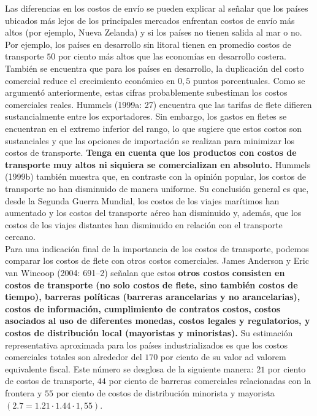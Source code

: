 Las diferencias en los costos de envío se pueden explicar al señalar que los países ubicados más lejos de los principales mercados enfrentan costos de envío más altos (por ejemplo, Nueva Zelanda) y si los países no tienen salida al mar o no. Por ejemplo, los países en desarrollo sin litoral tienen en promedio costos de transporte $50$ por ciento más altos que las economías en desarrollo costera. También se encuentra que para los países en desarrollo, la duplicación del costo comercial reduce el crecimiento económico en $0,5$ puntos porcentuales. Como se argumentó anteriormente, estas cifras probablemente subestiman los costos comerciales reales. Hummels (1999a: 27) encuentra que las tarifas de flete difieren sustancialmente entre los exportadores. Sin embargo, los gastos en fletes se encuentran en el extremo inferior del rango, lo que sugiere que estos costos son sustanciales y que las opciones de importación se realizan para minimizar los costos de transporte. \textbf{Tenga en cuenta que los productos con costos de transporte muy altos ni siquiera se comercializan en absoluto.} Hummels (1999b) también muestra que, en contraste con la opinión popular, los costos de transporte no han disminuido de manera uniforme. Su conclusión general es que, desde la Segunda Guerra Mundial, los costos de los viajes marítimos han aumentado y los costos del transporte aéreo han disminuido y, además, que los costos de los viajes distantes han disminuido en relación con el transporte cercano.\\
Para una indicación final de la importancia de los costos de transporte, podemos comparar los costos de flete con otros costos comerciales. James Anderson y Eric van Wincoop (2004: 691–2) señalan que estos \textbf{otros costos consisten en costos de transporte (no solo costos de flete, sino también costos de tiempo), barreras políticas (barreras arancelarias y no arancelarias), costos de información, cumplimiento de contratos costos, costos asociados al uso de diferentes monedas, costos legales y regulatorios, y costos de distribución local (mayoristas y minoristas).} Su estimación representativa aproximada para los países industrializados es que los costos comerciales totales son alrededor del $170$ por ciento de su valor ad valorem equivalente fiscal. Este número se desglosa de la siguiente manera: $21$ por ciento de costos de transporte, $44$ por ciento de barreras comerciales relacionadas con la frontera y $55$ por ciento de costos de distribución minorista y mayorista $(2.7 = 1.21 \cdot 1.44 \cdot 1,55)$.\\
